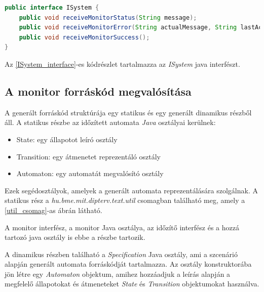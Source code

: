 \begin{lstlisting}[language=java,frame=single, float=h!, caption={Rendszer interfész Java implementációja.},captionpos=b, label=ISystem_interface]
public interface ISystem {
	public void receiveMonitorStatus(String message);
	public void receiveMonitorError(String actualMessage, String lastAcceptedMessage);
	public void receiveMonitorSuccess();
}
\end{lstlisting}

Az \ref{ISystem_interface}-es kódrészlet tartalmazza az \textit{ISystem} java interfészt.

\subsection{A monitor forráskód megvalósítása}
A generált forráskód struktúrája egy statikus és egy generált dinamikus részből áll.
A statikus részbe az időzített automata \textit{Java} osztályai kerülnek:
\begin{itemize}
    \item State: egy állapotot leíró osztály
    \item Transition: egy átmenetet reprezentáló osztály
    \item Automaton: egy automatát megvalósító osztály
\end{itemize}
Ezek segédosztályok, amelyek a generált automata reprezentálására szolgálnak.
A statikus rész a \textit{hu.bme.mit.dipterv.text.util} csomagban található meg, amely a \ref{util_csomag}-as ábrán látható.

A monitor interfész, a monitor Java osztálya, az időzítő interfész és a hozzá tartozó java osztály is ebbe a részbe tartozik.

A dinamikus részben található a \textit{Specification} Java osztály, ami a szcenárió alapján generált automata forráskódját tartalmazza.
Az osztály konstruktorába jön létre egy \textit{Automaton} objektum, amihez hozzáadjuk a leírás alapján a megfelelő állapotokat és átmeneteket \textit{State} és \textit{Transition} objektumokat használva.

